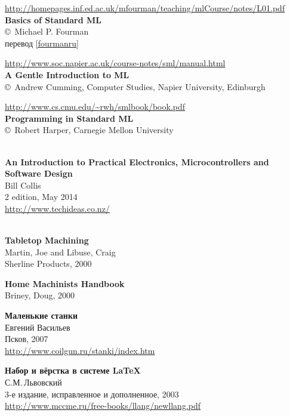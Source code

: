 \begin{thebibliography}{99}
\url{http://homepages.inf.ed.ac.uk/mfourman/teaching/mlCourse/notes/L01.pdf}\\
\textbf{Basics of Standard ML}\\
\copyright\ Michael P. Fourman\\
перевод \ref{fourmanru}

\url{http://www.soc.napier.ac.uk/course-notes/sml/manual.html}\\
\textbf{A Gentle Introduction to ML}\\
\copyright\ Andrew Cumming, Computer Studies, Napier University, Edinburgh

 \url{http://www.cs.cmu.edu/~rwh/smlbook/book.pdf}\\
\textbf{Programming in Standard ML}\\
\copyright\ Robert Harper, Carnegie Mellon University


 \\
\textbf{An Introduction to Practical Electronics, Microcontrollers
and Software Design}\\
Bill Collis\\
2 edition, May 2014\\
\url{http://www.techideas.co.nz/}


 \\
\textbf{Tabletop Machining}\\
Martin, Joe and Libuse, Craig\\
Sherline Products, 2000

\textbf{Home Machinists Handbook}\\
Briney, Doug, 2000

\textbf{Маленькие станки}\\
Евгений Васильев\\
Псков, 2007\\
\url{http://www.coilgun.ru/stanki/index.htm}


\subsecly{\LaTeX}

\textbf{Набор и вёрстка в системе \LaTeX}\\
С.М.\,Львовский\\
3-е издание, исправленное и дополненное, 2003\\
\url{http://www.mccme.ru/free-books/llang/newllang.pdf}


\end{thebibliography}
